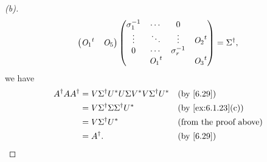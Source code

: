 \begin{proof}[(b)]
\begin{align*}
\begin{pmatrix}
           {\mathit{O}_1}^{t} & \mathit{O}_5
         \end{pmatrix} \begin{pmatrix}
                         \sigma_1^{-1} & \cdots     & 0             &            \\
                         \vdots        & \ddots     & \vdots        & {\mathit{O}_2}^{t} \\
                         0             & \cdots     & \sigma_r^{-1} &            \\
                                       & {\mathit{O}_1}^{t} &               & {\mathit{O}_3}^{t}
                       \end{pmatrix} = \Sigma^{\dag},
  \end{align*}
  we have
  \begin{align*}
    A^{\dag} A A^{\dag} & = V \Sigma^{\dag} U^* U \Sigma V^* V \Sigma^{\dag} U^* &  & \by{6.29}                     \\
                        & = V \Sigma^{\dag} \Sigma \Sigma^{\dag} U^*             &  & \by{ex:6.1.23}[c]             \\
                        & = V \Sigma^{\dag} U^*                                  &  & \text{(from the proof above)} \\
                        & = A^{\dag}.                                            &  & \by{6.29}
  \end{align*}
\end{proof}

